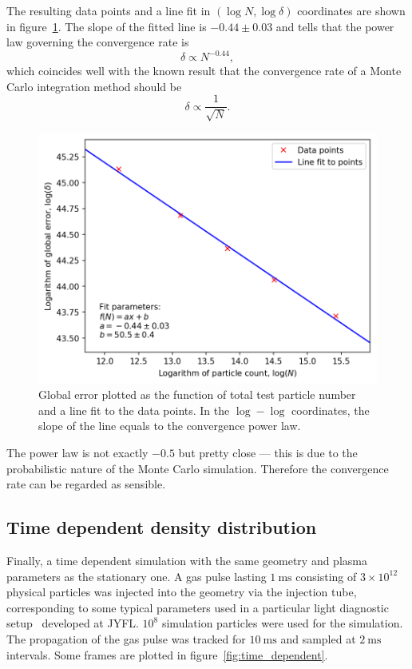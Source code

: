 \documentclass[a4paper,twoside,12pt]{article}
\begin{document}
The resulting data points and a line fit in $(\log N, \log \delta)$ coordinates are shown in figure~\ref{fig:convergence}. The slope of the fitted line is $-0.44 \pm 0.03$ and tells that the power law governing the convergence rate is
\[
    \delta \propto N^{-0.44},
\]
which coincides well with the known result that the convergence rate of a Monte Carlo integration method should be~\cite{kapanen:bsc}
\[
    \delta \propto \frac{1}{\sqrt{N}}.
\]

\begin{figure}[t]
    \centering
    \includegraphics{images/convergence_plot.png}
    \caption{Global error plotted as the function of total test particle
    number and a line fit to the data points. In the $\log-\log$ coordinates,
    the slope of the line equals to the convergence power law.}
    \label{fig:convergence}
\end{figure}

The power law is not exactly $-0.5$ but pretty close --- this is due to the probabilistic nature of the Monte Carlo simulation. Therefore the convergence rate can be regarded as sensible.

\subsection{Time dependent density distribution}

Finally, a time dependent simulation with the same geometry and plasma
parameters as the stationary one. A gas pulse lasting $\SI{1}{\milli\second}$
consisting of $3 \times 10^{12}$ physical particles was injected into the
geometry via the injection tube, corresponding to some typical parameters used
in a particular light diagnostic setup~\cite{kronholm:ecr} developed at JYFL. $10^8$ simulation particles were used
for the simulation. The propagation of the gas pulse was tracked for
$\SI{10}{\milli\second}$ and sampled at $\SI{2}{\milli\second}$ intervals. Some
frames are plotted in figure~\ref{fig:time_dependent}.
\end{document}
